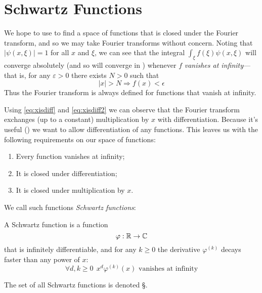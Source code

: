     \section{Schwartz Functions}
      We hope to use  to find a space of functions that is closed under the Fourier transform, and so we may take Fourier transforms without concern.
      Noting that $|\psi(x,\xi)|=1$ for all $x$ and $\xi$, we can see that the integral $\int_\xi f(\xi)\psi(x,\xi)$ will converge absolutely (and so will converge in \R) whenever $f$ \emph{vanishes at infinity}---that is, for any $\varepsilon>0$ there exists $N>0$ such that
      \begin{equation*}
        |x|>N \Rightarrow f(x)<\epsilon
      \end{equation*}
      Thus the Fourier transform is always defined for functions that vanish at infinity.

      Using \eqref{eq:xisdiff} and \eqref{eq:xisdiff2} we can observe that the Fourier transform exchanges (up to a constant) multiplication by $x$ with differentiation. 
      Because it's useful () we want to allow differentiation of any functions.
      This leaves us with the following requirements on our space of functions:
      \begin{enumerate}[label=(\alph*)]
        \item \label{i:vanish}Every function vanishes at infinity;
        \item \label{i:diff}It is closed under differentiation;
        \item \label{i:mult}It is closed under multiplication by $x$.
      \end{enumerate}
      We call such functions \emph{Schwartz functions}:


      \begin{defn}
        A Schwartz function is a function
        \begin{equation*}
          \varphi:\mathbb{R}\rightarrow\mathbb{C}
        \end{equation*}
        that is infinitely differentiable, and for any $k\ge0$ the derivative $\varphi^{(k)}$ decays faster than any power of $x$:
        \begin{equation*}
          \forall d,k\ge0\ \ x^d\varphi^{(k)}(x)\text{ vanishes at infinity}
        \end{equation*}

        The set of all Schwartz functions is denoted \S.
      \end{defn}

